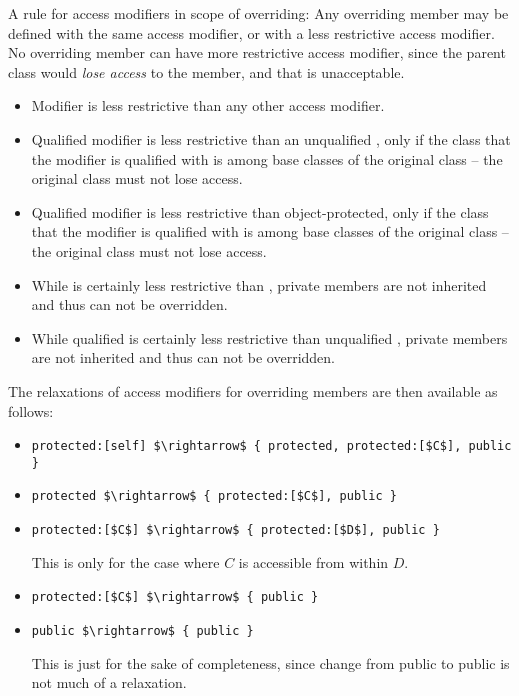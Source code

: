 A rule for access modifiers in scope of overriding: Any overriding member may be defined with the same access modifier, or with a less restrictive access modifier. No overriding member can have more restrictive access modifier, since the parent class would {\em lose access} to the member, and that is unacceptable. 
\begin{itemize}
\item Modifier  is less restrictive than any other access modifier. 
\item Qualified modifier  is less restrictive than an unqualified , only if the class that the modifier is qualified with is among base classes of the original class -- the original class must not lose access. 
\item Qualified modifier  is less restrictive than object-protected, only if the class that the modifier is qualified with is among base classes of the original class -- the original class must not lose access. 
\item While  is certainly less restrictive than , private members are not inherited and thus can not be overridden. 
\item While qualified  is certainly less restrictive than unqualified , private members are not inherited and thus can not be overridden. 
\end{itemize}
The relaxations of access modifiers for overriding members are then available as follows: 
\begin{itemize}
\item \lstinline!protected:[self] $\rightarrow$ { protected, protected:[$C$], public }!
\item \lstinline!protected $\rightarrow$ { protected:[$C$], public }!
\item \lstinline!protected:[$C$] $\rightarrow$ { protected:[$D$], public }!

This is only for the case where $C$ is accessible from within $D$. 
\item \lstinline!protected:[$C$] $\rightarrow$ { public }!
\item \lstinline!public $\rightarrow$ { public }!

This is just for the sake of completeness, since change from public to public is not much of a relaxation. 
\end{itemize}






